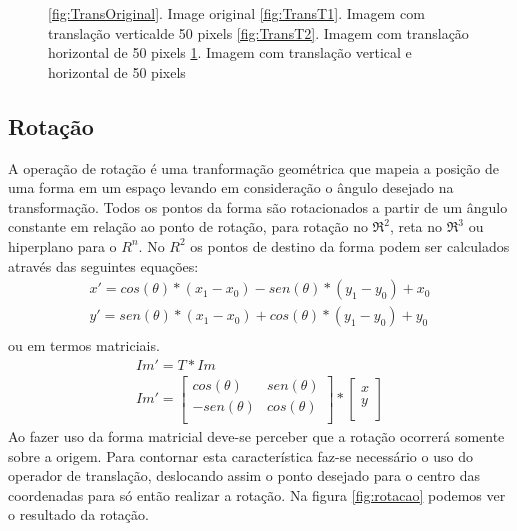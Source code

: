 \documentclass[
	article,			%
	11pt,				%
	oneside,			%
	a4paper,			%
	english,			%
	brazil,				%
	sumario=tradicional
	]{abntex2}
\begin{document}
\begin{figure}
\begin{subfigure}[b]{0.3\textwidth}
                \caption{}
                \label{fig:TransT3}       
        \end{subfigure}
        \caption{ \ref{fig:TransOriginal}. Image original
        \ref{fig:TransT1}. Imagem com translação verticalde 50 pixels
        \ref{fig:TransT2}. Imagem com translação horizontal  de 50 pixels
        \ref{fig:TransT3}. Imagem com translação vertical e horizontal de 50
        pixels}
        \label{fig:translacao}
\end{figure}

\subsection{Rotação}
A operação de rotação é uma tranformação geométrica que mapeia a posição de uma
forma em um espaço levando em consideração o ângulo desejado na transformação.
Todos os pontos da forma são rotacionados a partir de um ângulo constante em
relação ao ponto de rotação, para rotação no $\Re^2$, reta no $\Re^3$ ou
hiperplano para o $R^n$.
No $R^2$ os pontos de destino da forma podem ser calculados através das
seguintes equações:
\begin{align}
x'=cos(\theta)*(x_1-x_0)-sen(\theta)*(y_1-y_0)+x_0\\
y'=sen(\theta)*(x_1-x_0)+cos(\theta)*(y_1-y_0)+y_0\\
\end{align}
ou em termos matriciais.
\begin{align}
Im'=T*Im\\
Im'=\begin{bmatrix}
cos(\theta) & sen(\theta)\\
-sen(\theta) & cos(\theta)\\
\end{bmatrix}*
\begin{bmatrix}
x\\
y\\
\end{bmatrix}
\end{align}
Ao fazer uso da forma matricial deve-se perceber que a rotação ocorrerá somente
sobre a origem. Para contornar esta característica faz-se necessário o uso do
operador de translação, deslocando assim o ponto desejado para o centro das
coordenadas para só então realizar a rotação. Na figura \ref{fig:rotacao}
podemos ver o resultado da rotação.
\end{document}

